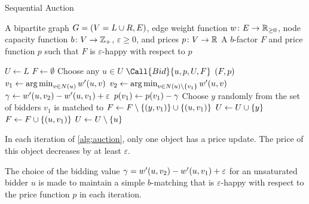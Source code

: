 \begin{algorithm}[!h]
    \caption{Sequential Auction} \label{alg:auction}
    \begin{algorithmic}[1]
        \AlgIn A bipartite graph $G = \lrp{V = L \cup R, E}$, edge weight function $w \colon E \to \R_{\geq 0}$, node capacity function $b \colon V \to \Z_+$, $\varepsilon \geq 0$, and prices $p\colon V \to \R$
        \AlgOut A $b$-factor $F$ and price function $p$ such that $F$ is $\varepsilon$-happy with respect to $p$

        \State $U \gets L$ 
        \State $F \gets \emptyset$
            \State Choose any $u \in U$
            \State $\Call{Bid}{u, p, U, F}$
        \EndWhile
        \State \Return $\lrp{F, p}$
        \State
            \State $v_1 \gets \argmin_{v \in N(u)} \f[w^\prime]{u, v}$ 
            \State $v_2 \gets \argmin_{v \in N(u) \sm \lrc{v_1} } \f[w^\prime]{u, v}$ 
            \State $\gamma \gets \f[w^\prime]{u, v_2} - \f[w^\prime]{u, v_1} + \varepsilon$ 
            \State $\f[p]{v_1} \gets \f[p]{v_1} - \gamma$ %
             
                \State Choose $y$ randomly from the set of bidders $v_1$ is matched to
                \State $F \gets F \sm \lrc{\lrp{y, v_1}} \cup \lrc{\lrp{u, v_1}}$ 
                \State $U \gets U \cup \lrc{y}$   
            \Else 
                \State $F \gets F \cup \lrc{\lrp{u, v_1}}$
            \EndIf
             
                \State $U \gets U \sm \lrc{u}$  
            \EndIf 
        \EndProcedure
    \end{algorithmic}
\end{algorithm}

\begin{observation}
    In each iteration of \cref{alg:auction}, only one object has a price update. The price of this object decreases by at least $\varepsilon$. 
    \label{obs:price-update}
\end{observation}

The choice of the bidding value $\gamma = \f[w^\prime]{u, v_2} - \f[w^\prime]{u, v_1} + \varepsilon$ for an unsaturated bidder $u$
is made to maintain a simple $b$-matching that is $\varepsilon$-happy with respect to the price function $p$ in each iteration. 


